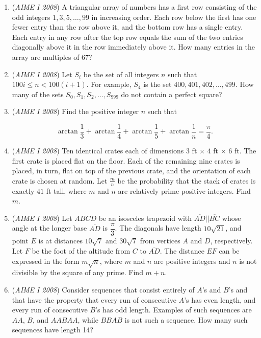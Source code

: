 \begin{enumerate}
 

	\item (\textit{AIME I 2008}) A triangular array of numbers has a first row consisting of the odd integers $1,3,5,\ldots,99$ in increasing order.  Each row below the first has one fewer entry than the row above it, and the bottom row has a single entry.  Each entry in any row after the top row equals the sum of the two entries diagonally above it in the row immediately above it.  How many entries in the array are multiples of $67$?


 

	\item (\textit{AIME I 2008}) Let $S_i$ be the set of all integers $n$ such that $100i\leq n < 100(i + 1)$.  For example, $S_4$ is the set ${400,401,402,\ldots,499}$.  How many of the sets $S_0, S_1, S_2, \ldots, S_{999}$ do not contain a perfect square?


 

	\item (\textit{AIME I 2008}) Find the positive integer $n$ such that 


 
 \[\arctan\frac {1}{3} + \arctan\frac {1}{4} + \arctan\frac {1}{5} + \arctan\frac {1}{n} = \frac {\pi}{4}.\]


	\item (\textit{AIME I 2008}) Ten identical crates each of dimensions $3$ ft $\times$ $4$ ft $\times$ $6$ ft.  The first crate is placed flat on the floor.  Each of the remaining nine crates is placed, in turn, flat on top of the previous crate, and the orientation of each crate is chosen at random.  Let $\frac {m}{n}$ be the probability that the stack of crates is exactly $41$ ft tall, where $m$ and $n$ are relatively prime positive integers.  Find $m$.


 

	\item (\textit{AIME I 2008}) Let $ABCD$ be an isosceles trapezoid with $\overline{AD}||\overline{BC}$ whose angle at the longer base $\overline{AD}$ is $\dfrac{\pi}{3}$. The diagonals have length $10\sqrt {21}$, and point $E$ is at distances $10\sqrt {7}$ and $30\sqrt {7}$ from vertices $A$ and $D$, respectively. Let $F$ be the foot of the altitude from $C$ to $\overline{AD}$. The distance $EF$ can be expressed in the form $m\sqrt {n}$, where $m$ and $n$ are positive integers and $n$ is not divisible by the square of any prime. Find $m + n$.


 

	\item (\textit{AIME I 2008}) Consider sequences that consist entirely of $A$'s and $B$'s and that have the property that every run of consecutive $A$'s has even length, and every run of consecutive $B$'s has odd length. Examples of such sequences are $AA$, $B$, and $AABAA$, while $BBAB$ is not such a sequence. How many such sequences have length 14?



\end{enumerate}
